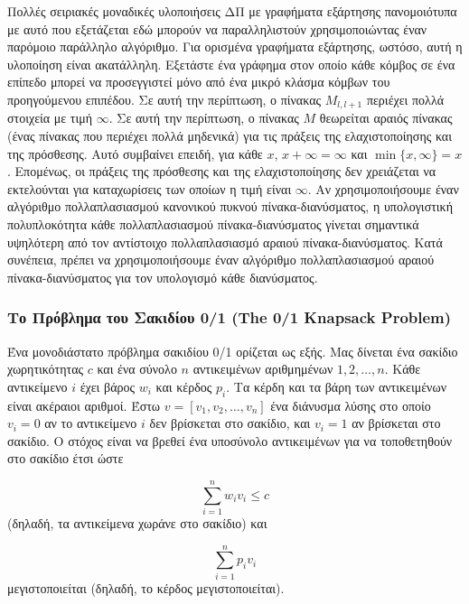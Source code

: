 \documentclass[12pt,a4paper]{article} %
\begin{document}
{{Πολλές σειριακές μοναδικές υλοποιήσεις ΔΠ με γραφήματα εξάρτησης 
πανομοιότυπα με αυτό που εξετάζεται εδώ μπορούν να παραλληλιστούν 
χρησιμοποιώντας έναν παρόμοιο παράλληλο αλγόριθμο. Για ορισμένα 
γραφήματα εξάρτησης, ωστόσο, αυτή η υλοποίηση είναι ακατάλληλη. Εξετάστε 
ένα γράφημα στον οποίο κάθε κόμβος σε ένα επίπεδο μπορεί να προσεγγιστεί 
μόνο από ένα μικρό κλάσμα κόμβων του προηγούμενου επιπέδου. Σε αυτή την 
περίπτωση, ο πίνακας $M_{l,l+1}$ περιέχει πολλά στοιχεία με τιμή 
$\infty$. Σε αυτή την περίπτωση, ο πίνακας $M$ 
θεωρείται αραιός πίνακας (ένας πίνακας που περιέχει 
πολλά μηδενικά) για τις πράξεις της ελαχιστοποίησης και της πρόσθεσης. 
Αυτό συμβαίνει επειδή, για κάθε $x$, $x + \infty = \infty$ και 
$\min\{x, \infty\} = x$. Επομένως, οι πράξεις της πρόσθεσης και της 
ελαχιστοποίησης δεν χρειάζεται να εκτελούνται για καταχωρίσεις των 
οποίων η τιμή είναι $\infty$. Αν χρησιμοποιήσουμε έναν αλγόριθμο 
πολλαπλασιασμού κανονικού πυκνού πίνακα-διανύσματος, η υπολογιστική 
πολυπλοκότητα κάθε πολλαπλασιασμού πίνακα-διανύσματος γίνεται σημαντικά 
υψηλότερη από τον αντίστοιχο πολλαπλασιασμό αραιού πίνακα-διανύσματος. 
Κατά συνέπεια, πρέπει να χρησιμοποιήσουμε έναν αλγόριθμο πολλαπλασιασμού 
αραιού πίνακα-διανύσματος για τον υπολογισμό κάθε διανύσματος.

\subsubsection[Το Πρόβλημα του Σακιδίου 0/1 (The 0/1 Knap\-sack Problem)]{Το Πρόβλημα του Σακιδίου 0/1 (The 0/1 Knapsack Problem)}

Ένα μονοδιάστατο πρόβλημα σακιδίου 0/1 ορίζεται ως εξής. Μας δίνεται 
ένα σακίδιο χωρητικότητας $c$ και ένα σύνολο $n$ αντικειμένων 
αριθμημένων $1, 2, \dots, n$. Κάθε αντικείμενο $i$ έχει βάρος $w_i$ και 
κέρδος $p_i$. Τα κέρδη και τα βάρη των αντικειμένων είναι ακέραιοι 
αριθμοί. Έστω $v = [v_1, v_2, \dots, v_n]$ ένα διάνυσμα λύσης στο οποίο 
$v_i = 0$ αν το αντικείμενο $i$ δεν βρίσκεται στο σακίδιο, και 
$v_i = 1$ αν βρίσκεται στο σακίδιο. Ο στόχος είναι να βρεθεί ένα 
υποσύνολο αντικειμένων για να τοποθετηθούν στο σακίδιο έτσι ώστε

\[
\sum_{i=1}^{n} w_i v_i \leq c
\]
\vspace{0.2cm}
\noindent
(δηλαδή, τα αντικείμενα χωράνε στο σακίδιο) και

\[
\sum_{i=1}^{n} p_i v_i
\]
\vspace{0.2cm}
\noindent
μεγιστοποιείται (δηλαδή, το κέρδος μεγιστοποιείται).

}}
\end{document}
